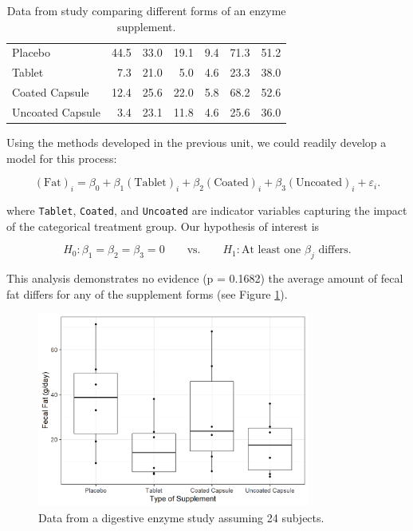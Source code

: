 \documentclass[
]{book}
\theoremstyle{plain}
\theoremstyle{mydefn}
\theoremstyle{myexmpl}
\theoremstyle{remark}
\begin{document}
\begin{table}

\caption{\label{tab:rm-enzyme-data-table}Data from study comparing different forms of an enzyme supplement.}
\centering
\begin{tabular}[t]{lrrrrrr}
\toprule
Placebo & 44.5 & 33.0 & 19.1 & 9.4 & 71.3 & 51.2\\
Tablet & 7.3 & 21.0 & 5.0 & 4.6 & 23.3 & 38.0\\
Coated Capsule & 12.4 & 25.6 & 22.0 & 5.8 & 68.2 & 52.6\\
Uncoated Capsule & 3.4 & 23.1 & 11.8 & 4.6 & 25.6 & 36.0\\
\bottomrule
\end{tabular}
\end{table}

Using the methods developed in the previous unit, we could readily develop a model for this process:

\[(\text{Fat})_i = \beta_0 + \beta_1 (\text{Tablet})_i + \beta_2 (\text{Coated})_i + \beta_3 (\text{Uncoated})_i + \varepsilon_i.\]

where \texttt{Tablet}, \texttt{Coated}, and \texttt{Uncoated} are indicator variables capturing the impact of the categorical treatment group. Our hypothesis of interest is

\[H_0: \beta_1 = \beta_2 = \beta_3 = 0 \qquad \text{vs.} \qquad H_1: \text{At least one } \beta_j \text{ differs}.\]

This analysis demonstrates no evidence (p = 0.1682) the average amount of fecal fat differs for any of the supplement forms (see Figure \ref{fig:rm-terminology-enzyme-plot}).

\begin{figure}

{\centering \includegraphics[width=0.8\textwidth]{./Images/rm-terminology-enzyme-plot-1} 

}

\caption{Data from a digestive enzyme study assuming 24 subjects.}\label{fig:rm-terminology-enzyme-plot}
\end{figure}
\end{document}

